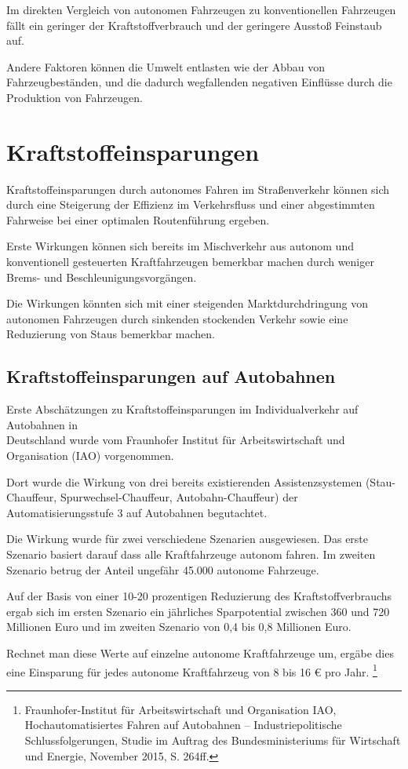 Im direkten Vergleich von autonomen Fahrzeugen zu konventionellen Fahrzeugen fällt ein geringer der Kraftstoffverbrauch und der geringere Ausstoß Feinstaub auf.

Andere Faktoren können die Umwelt entlasten wie der Abbau von Fahrzeugbeständen, und die dadurch wegfallenden negativen Einflüsse durch die Produktion von Fahrzeugen.

\section{Kraftstoffeinsparungen}
Kraftstoffeinsparungen durch autonomes Fahren im Straßenverkehr können sich durch
eine Steigerung der Effizienz im Verkehrsfluss und
einer abgestimmten Fahrweise bei einer optimalen Routenführung ergeben.

Erste Wirkungen können sich bereits im Mischverkehr aus autonom und konventionell gesteuerten Kraftfahrzeugen bemerkbar machen durch weniger
Brems- und Beschleunigungsvorgängen.

Die Wirkungen könnten sich mit einer steigenden Marktdurchdringung von autonomen Fahrzeugen
durch sinkenden stockenden Verkehr sowie eine Reduzierung von Staus bemerkbar machen.

\subsection{Kraftstoffeinsparungen auf Autobahnen}
Erste Abschätzungen zu Kraftstoff\-einsparungen im Individualverkehr auf Autobahnen in\\
Deutschland wurde vom Fraunhofer
Institut für Arbeitswirtschaft und Organisation (IAO) vorgenommen.

Dort wurde die Wirkung von drei bereits existierenden Assistenzsystemen (Stau-Chauffeur, Spurwechsel-Chauffeur, Autobahn-Chauffeur)
der Automatisierungsstufe 3 auf Autobahnen begutachtet.

Die Wirkung wurde für zwei verschiedene Szenarien ausgewiesen.
Das erste Szenario basiert darauf dass alle Kraftfahrzeuge autonom fahren.
Im zweiten Szenario betrug der Anteil ungefähr 45.000 autonome Fahrzeuge.

Auf der Basis von einer 10-20 prozentigen Reduzierung des Kraftstoffverbrauchs ergab sich
im ersten Szenario ein jährliches Sparpotential zwischen 360 und 720 Millionen Euro und
im zweiten Szenario von 0,4 bis 0,8 Millionen Euro.

Rechnet man diese Werte auf einzelne autonome Kraftfahrzeuge um,
ergäbe dies eine Einsparung für jedes autonome Kraftfahrzeug von 8 bis 16 € pro Jahr.
\footnote{Fraunhofer-Institut für Arbeitswirtschaft und Organisation IAO, Hochautomatisiertes
	Fahren auf Autobahnen – Industriepolitische Schlussfolgerungen, Studie im Auftrag des
	Bundesministeriums für Wirtschaft und Energie, November 2015, S. 264ff.}

